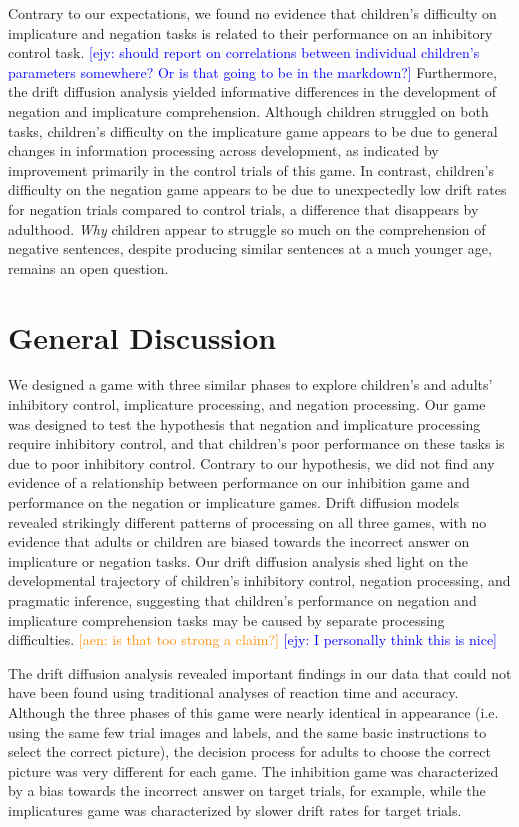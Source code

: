 \documentclass[10pt,letterpaper]{article}
\newcommand{\ejy}[1]{\textcolor{Blue}{[ejy: #1]}}
\newcommand{\aen}[1]{\textcolor{DarkOrange}{[aen: #1]}}
\begin{document}
Contrary to our expectations, we found no evidence that children's difficulty on implicature and negation tasks is related to their performance on an inhibitory control task. \ejy{should report on correlations between individual children's parameters somewhere? Or is that going to be in the markdown?}  Furthermore, the drift diffusion analysis yielded informative differences in the development of negation and implicature comprehension.  Although children struggled on both tasks, children's difficulty on the implicature game appears to be due to general changes in information processing across development, as indicated by improvement primarily in the control trials of this game.  In contrast, children's difficulty on the negation game appears to be due to unexpectedly low drift rates for negation trials compared to control trials, a difference that disappears by adulthood.  \emph{Why} children appear to struggle so much on the comprehension of negative sentences, despite producing similar sentences at a much younger age, remains an open question.  


\section{General Discussion}

We designed a game with three similar phases to explore children's and adults' inhibitory control, implicature processing, and negation processing.  Our game was designed to test the hypothesis that negation and implicature processing require inhibitory control, and that children's poor performance on these tasks is due to poor inhibitory control.  Contrary to our hypothesis, we did not find any evidence of a relationship between performance on our inhibition game and performance on the negation or implicature games.  Drift diffusion models revealed strikingly different patterns of processing on all three games, with no evidence that adults or children are biased towards the incorrect answer on implicature or negation tasks.  Our drift diffusion analysis shed light on the developmental trajectory of children's inhibitory control, negation processing, and pragmatic inference, suggesting that children's performance on negation and implicature comprehension tasks may be caused by separate processing difficulties. \aen{is that too strong a claim?} \ejy{I personally think this is nice}

The drift diffusion analysis revealed important findings in our data that could not have been found using traditional analyses of reaction time and accuracy.  Although the three phases of this game were nearly identical in appearance (i.e. using the same few trial images and labels, and the same basic instructions to select the correct picture), the decision process for adults to choose the correct picture was very different for each game.  The inhibition game was characterized by a bias towards the incorrect answer on target trials, for example, while the implicatures game was characterized by slower drift rates for target trials.  
\end{document}
